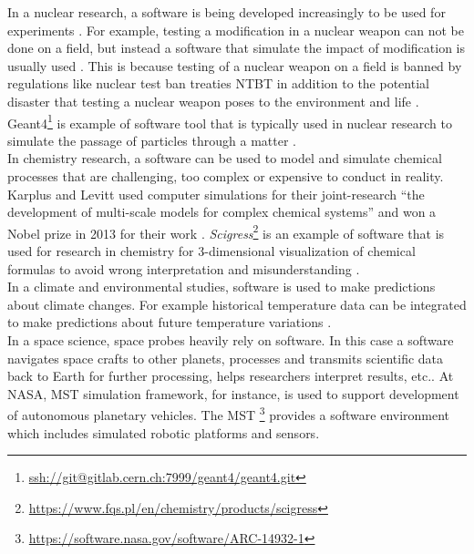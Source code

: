 In a nuclear research, a software is being developed increasingly to be used for experiments \citep{yan2017case}. For example, testing a modification in a nuclear weapon can not be done on a field, but instead a software that simulate the impact of modification is usually used \citep{kanewala2014testing}. This is because testing of a nuclear weapon on a field is banned by regulations like nuclear test ban treaties \ac{NTBT} in addition to the potential disaster that testing a nuclear weapon poses to the environment and life \citep{enwiki:1053274189}. \ac{Geant4}\footnote{\url{ssh://git@gitlab.cern.ch:7999/geant4/geant4.git}} is example of software tool that is typically used in nuclear research to simulate the passage of particles through a matter \citep{agostinelli2003geant4}.  \\


In chemistry research, a software can be used to model and simulate chemical processes that are challenging, too complex or expensive to conduct in reality. Karplus and Levitt used computer simulations for their joint-research “the development of multi-scale models for complex chemical systems”  and won a Nobel prize in 2013 for their work \citep{storer2017bridging, andre2014nobel}. \emph{Scigress}\footnote{\url{https://www.fqs.pl/en/chemistry/products/scigress}} is an example of software that is used for research in chemistry for 3-dimensional visualization of chemical formulas to avoid wrong interpretation and misunderstanding \citep{enwiki:1051856557, marchand2014applications}.  \\

In a climate and environmental studies, software is used to make predictions about climate changes. For example historical temperature data can be integrated to make predictions about future temperature variations \citep{storer2017bridging}.  \\


In a space science, space probes heavily rely on software. In this case a software navigates space crafts to other planets, processes and transmits scientific data back to Earth for further processing, helps researchers interpret results, etc.\citep{lutz2011software}. At \ac{NASA}, \ac{MST} simulation framework, for instance, is used to support development of autonomous planetary vehicles. The \ac{MST} \footnote{\url{https://software.nasa.gov/software/ARC-14932-1}} provides a software environment which includes simulated robotic platforms and sensors.  \\

